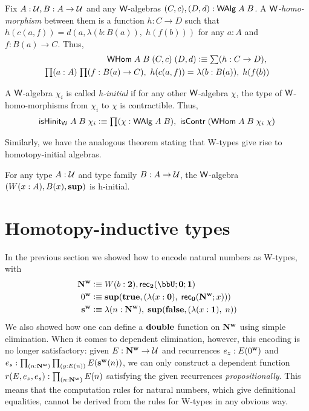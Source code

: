 \begin{defn}
Fix $A : \mathcal{U}, B : A \to \mathcal{U}$ and any $\mathsf{W}$-algebras $(C,c),(D,d) : \mathsf{\mathsf{W} Alg} \; A \; B$. A \emph{$\mathsf{W}$-homo-morphism} between them is a function $h : C \to D$ such that $h(c(a,f)) = d(a,\lambda (b : B(a)), \; h(f(b)))$ for any $a : A$ and $f : B(a) \to C$. Thus,
\begin{align*}
\whom \; A \; B \; (C, c) \; (D,d) \defeq \sm {h : C \to D} \\ \prd{a:A}{f:B(a)\to C} \id{h(c(a,f))}{\lambda (b : B(a)), \; h(f(b))}
\end{align*}
\end{defn}

\begin{defn}
A $\mathsf{W}$-algebra $\chi_i$ is called \emph{h-initial} if for any other $\mathsf{W}$-algebra $\chi$, the type of $\mathsf{W}$-homo-morphisms from $\chi_i$ to $\chi$ is contractible. Thus,
\begin{align*}
\ishinitw \; A \; B \; \chi_i \defeq \prd{\chi : \walg \; A \; B} \iscontr \; (\whom \; A \; B \; \chi_i\; \chi)
\end{align*}
\end{defn}

Similarly, we have the analogous theorem stating that W-types give rise to homotopy-initial algebras.
\begin{thm}\label{thm:w-hinit}
For any type $A : \mathcal{U}$ and type family $B : A \to \mathcal{U}$, the $\mathsf{W}$-algebra $(W(x:A),{B(x)}, \mathbf{sup})$ is h-initial.
\end{thm}



\section{Homotopy-inductive types}
\label{sec:htpy-inductive}

In the previous section we showed how to encode natural numbers as W-types, with 
\begin{align*}
\natw & \defeq \wtype{b:\two} \rec\two(\bbU;\zero;\one) \\
\zw & \defeq \supp(\true, (\lambda (x : \zero), \; \rec\zero(\natw;x))) \\
\sw & \defeq \lambda (n : \natw), \; \supp(\false, (\lambda (x : \one), \; n))
\end{align*}
We also showed how one can define a $\mathbf{double}$ function on $\mathbf{N^w}$ using simple elimination. When it comes to dependent elimination, however, this encoding is no longer satisfactory: given $E : \mathbf{N^w} \to \mathcal{U}$ and recurrences $e_z : E(0^\mathbf{w})$ and $e_s : \prd{n : \natw}{y : E(n)} E(\sw(n))$, we can only construct a dependent function $r(E,e_z,e_s) : \prd{n : \natw} E(n)$ satisfying the given recurrences \emph{propositionally}. This means that the computation rules for natural numbers, which give definitional equalities, cannot be derived from the rules for W-types in any obvious way.

